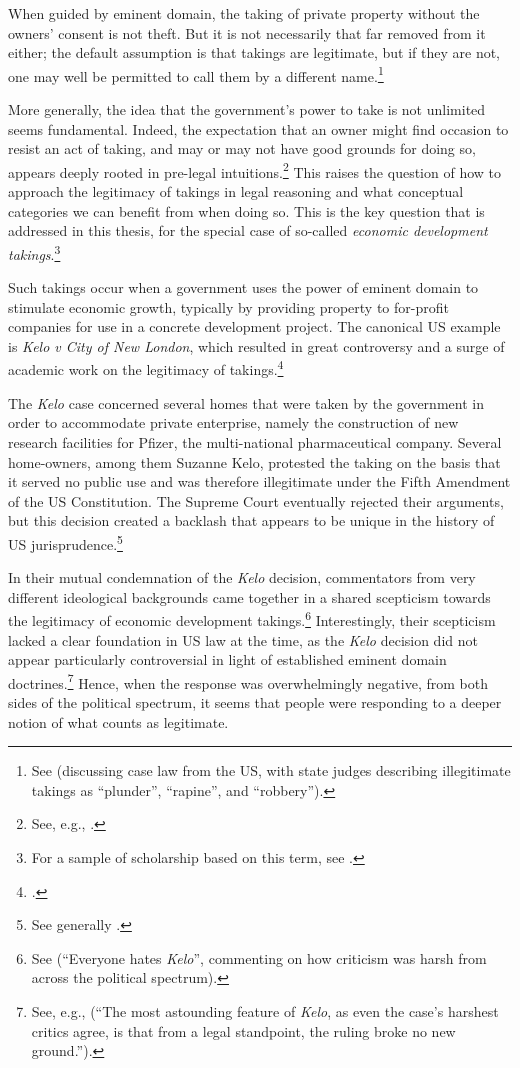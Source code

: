 When guided by eminent domain, the taking of private property without the owners' consent is not theft. But it is not necessarily that far removed from it either; the default assumption is that takings are legitimate, but if they are not, one may well be permitted to call them by a different name.\footnote{See \cite[8-10]{gray11} (discussing case law from the US, with state judges describing illegitimate takings as ``plunder'', ``rapine'', and ``robbery'').}

More generally, the idea that the government's power to take is not unlimited seems fundamental. Indeed, the expectation that an owner might find occasion to resist an act of taking, and may or may not have good grounds for doing so, appears deeply rooted in pre-legal intuitions.\footnote{See, e.g., \cite[159]{gray94}.} This raises the question of how to approach the legitimacy of takings in legal reasoning and what conceptual categories we can benefit from when doing so. This is the key question that is addressed in this thesis, for the special case of so-called {\it economic development takings}.\footnote{For a sample of scholarship based on this term, see \cite{cohen06,somin07,wilt09,yellin11}.}

Such takings occur when a government uses the power of eminent domain to stimulate economic growth, typically by providing property to for-profit companies for use in a concrete development project. The canonical US example is {\it Kelo v City of New London}, which resulted in great controversy and a surge of academic work on the legitimacy of takings.\footcite{kelo05}

The {\it Kelo} case concerned several homes that were taken by the government in order to accommodate private enterprise, namely the construction of new research facilities for Pfizer, the multi-national pharmaceutical company. Several home-owners, among them Suzanne Kelo, protested the taking on the basis that it served no public use and was therefore illegitimate under the Fifth Amendment of the US Constitution. The Supreme Court eventually rejected their arguments, but this decision created a backlash that appears to be unique in the history of US jurisprudence.\footnote{See generally \cite{somin08}.}

In their mutual condemnation of the {\it Kelo} decision, commentators from very different ideological backgrounds came together in a shared scepticism towards the legitimacy of economic development takings.\footnote{See \cite[1413-1415]{bell06} (``Everyone hates {\it Kelo}'', commenting on how criticism was harsh from across the political spectrum).} Interestingly, their scepticism lacked a clear foundation in US law at the time, as the {\it Kelo} decision did not appear particularly controversial in light of established eminent domain doctrines.\footnote{See, e.g., \cite[1418]{bell06} (``The most astounding feature of {\it Kelo}, as even the case's harshest critics agree, is that from a legal standpoint, the ruling broke no new ground.'').} Hence, when the response was overwhelmingly negative, from both sides of the political spectrum, it seems that people were responding to a deeper notion of what counts as legitimate.

